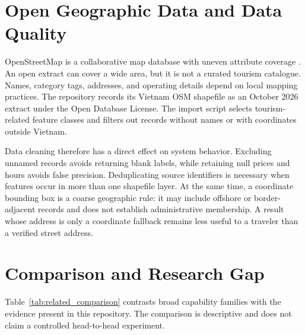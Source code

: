 \section{Open Geographic Data and Data Quality}

OpenStreetMap is a collaborative map database with uneven attribute coverage \cite{haklay2008openstreetmap}. An open extract can cover a wide area, but it is not a curated tourism catalogue. Names, category tags, addresses, and operating details depend on local mapping practices. The repository records its Vietnam OSM shapefile as an October 2026 extract under the Open Database License. The import script selects tourism-related feature classes and filters out records without names or with coordinates outside Vietnam.

Data cleaning therefore has a direct effect on system behavior. Excluding unnamed records avoids returning blank labels, while retaining null prices and hours avoids false precision. Deduplicating source identifiers is necessary when features occur in more than one shapefile layer. At the same time, a coordinate bounding box is a coarse geographic rule: it may include offshore or border-adjacent records and does not establish administrative membership. A result whose address is only a coordinate fallback remains less useful to a traveler than a verified street address.

\section{Comparison and Research Gap}

Table~\ref{tab:related_comparison} contrasts broad capability families with the evidence present in this repository. The comparison is descriptive and does not claim a controlled head-to-head experiment.

